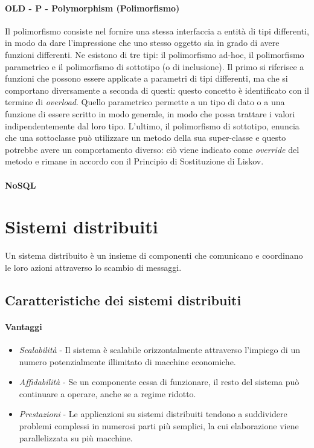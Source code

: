 \documentclass{article}
\begin{document}
        \paragraph{OLD - P - Polymorphism (Polimorfismo)} Il polimorfismo consiste nel fornire una stessa interfaccia a entità di tipi differenti, in modo da dare l'impressione che uno stesso oggetto sia in grado di avere funzioni differenti. Ne esistono di tre tipi: il polimorfismo ad-hoc, il polimorfismo parametrico e il polimorfismo di sottotipo (o di inclusione). Il primo si riferisce a funzioni che possono essere applicate a parametri di tipi differenti, ma che si comportano diversamente a seconda di questi: questo concetto è identificato con il termine di \textit{overload}. Quello parametrico permette a un tipo di dato o a una funzione di essere scritto in modo generale, in modo che possa trattare i valori indipendentemente dal loro tipo. L'ultimo, il polimorfismo di sottotipo, enuncia che una sottoclasse può utilizzare un metodo della sua super-classe e questo potrebbe avere un comportamento diverso: ciò viene indicato come \textit{override} del metodo e rimane in accordo con il Principio di Sostituzione di Liskov.
        \paragraph{NoSQL}
\section{Sistemi distribuiti}
    Un sistema distribuito è un insieme di componenti che comunicano e coordinano le loro azioni attraverso lo scambio di messaggi.
    \subsection{Caratteristiche dei sistemi distribuiti}
        \paragraph{Vantaggi}
            \begin{itemize}
                \item \textit{Scalabilità} - Il sistema è scalabile orizzontalmente attraverso l'impiego di un numero potenzialmente illimitato di macchine economiche.
                \item \textit{Affidabilità} - Se un componente cessa di funzionare, il resto del sistema può continuare a operare, anche se a regime ridotto.
                \item \textit{Prestazioni} - Le applicazioni su sistemi distribuiti tendono a suddividere problemi complessi in numerosi parti più semplici, la cui elaborazione viene parallelizzata su più macchine.
            \end{itemize}
\end{document}
